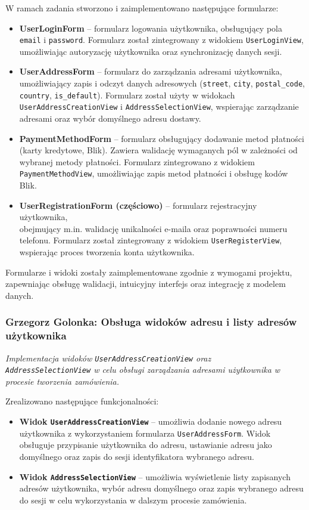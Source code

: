 \documentclass[12pt,a4paper,oneside]{article}
\theoremstyle{definition}
\numberwithin{equation}{section}
\begin{document}
W ramach zadania stworzono i zaimplementowano następujące formularze:
\begin{itemize}
    \item \textbf{UserLoginForm} – formularz logowania użytkownika, obsługujący pola \texttt{email} i \texttt{password}. Formularz został zintegrowany z widokiem \texttt{UserLoginView}, umożliwiając autoryzację użytkownika oraz synchronizację danych sesji.
    \item \textbf{UserAddressForm} – formularz do zarządzania adresami użytkownika, umożliwiający zapis
     i odczyt danych adresowych (\texttt{street}, \texttt{city}, \texttt{postal\_code}, 
     \texttt{country}, \texttt{is\_default}). Formularz został użyty w widokach\\ \texttt{UserAddressCreationView} i \texttt{AddressSelectionView}, wspierając zarządzanie adresami oraz wybór domyślnego adresu dostawy.
    \item \textbf{PaymentMethodForm} – formularz obsługujący dodawanie metod płatności (karty kredytowe, Blik). Zawiera walidację 
    wymaganych pól w zależności od wybranej metody płatności. 
    Formularz zintegrowano z widokiem\\ \texttt{PaymentMethodView}, umożliwiając zapis metod płatności i obsługę kodów Blik.
    \item \textbf{UserRegistrationForm (częściowo)} – formularz rejestracyjny użytkownika,\\
     obejmujący m.in. walidację unikalności e-maila oraz poprawności numeru telefonu. 
    Formularz został zintegrowany z widokiem \texttt{UserRegisterView}, wspierając 
    proces tworzenia konta użytkownika.
\end{itemize}

Formularze i widoki zostały zaimplementowane zgodnie z wymogami projektu, zapewniając obsługę walidacji, intuicyjny interfejs oraz integrację z modelem danych.
%
%
\subsubsection{Grzegorz Golonka: Obsługa widoków adresu i listy adresów użytkownika}
\label{section:1.3.24}
\textit{
Implementacja widoków \texttt{UserAddressCreationView} oraz\\ \texttt{AddressSelectionView} w celu obsługi zarządzania adresami użytkownika w procesie tworzenia zamówienia.
}

Zrealizowano następujące funkcjonalności:
\begin{itemize}
    \item \textbf{Widok \texttt{UserAddressCreationView}} – umożliwia dodanie nowego adresu użytkownika z wykorzystaniem formularza \texttt{UserAddressForm}. Widok obsługuje przypisanie użytkownika do adresu, ustawianie adresu jako domyślnego oraz zapis do sesji identyfikatora wybranego adresu.
    \item \textbf{Widok \texttt{AddressSelectionView}} – umożliwia wyświetlenie listy zapisanych adresów użytkownika, wybór adresu domyślnego oraz zapis wybranego adresu do sesji w celu wykorzystania w dalszym procesie zamówienia.
\end{itemize}
\end{document}
